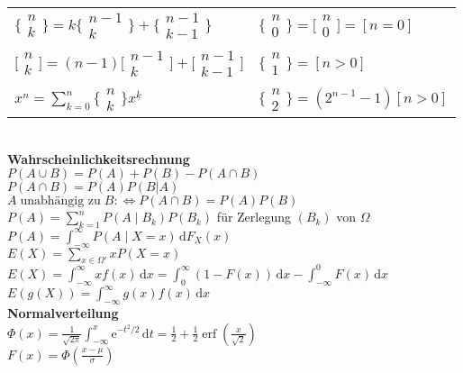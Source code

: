 \documentclass[a4paper,10pt,fleqn,twoside,twocolumn,dvipdfmx]{scrartcl}
\newcommand{\strong}[1]{\textsf{\textbf{#1}}}
\newcommand{\tsbrace}[2]{%
  \big\{\!\begin{smallmatrix}#1\\ #2\end{smallmatrix}\!\big\}}
\newcommand{\tsbracket}[2]{%
  \big[\!\begin{smallmatrix}#1\\ #2\end{smallmatrix}\!\big]}
\begin{document}
\begin{tabular}{@{}l|l}
$\tsbrace{n}{k} = k\tsbrace{n-1}{k}+\tsbrace{n-1}{k-1}$
& $\tsbrace{n}{0} = \tsbracket{n}{0} = [n{=}0]$\\[3pt]
$\tsbracket{n}{k} = (n-1)\tsbracket{n-1}{k}+\tsbracket{n-1}{k-1}$
& $\tsbrace{n}{1}=[n{>}0]$\\[3pt]
$x^n = \sum_{k=0}^n \tsbrace{n}{k} x^{\underline k}$
& $\tsbrace{n}{2} = (2^{n-1}-1)[n{>}0]$
\end{tabular}\\[4pt]
\strong{Wahrscheinlichkeitsrechnung}\\
$P(A\cup B) = P(A)+P(B)-P(A\cap B)$\\
$P(A\cap B) = P(A)P(B|A)$\\
$A\;\text{unabhängig zu}\;B :\Leftrightarrow P(A\cap B) = P(A)P(B)$\\
$P(A) = \sum_{k=1}^n P(A\mid B_k)P(B_k)$ für Zerlegung $(B_k)$ von $\Omega$\\
$P(A) = \int_{-\infty}^\infty P(A\mid X=x)\,\mathrm dF_X(x)$\\
$E(X) = \sum_{x\in\Omega'} xP(X=x)$\\
$E(X) = \int_{-\infty}^\infty xf(x)\,\mathrm dx
= \int_0^\infty (1-F(x))\,\mathrm dx - \int_{-\infty}^0 F(x)\,\mathrm dx$\\
$E(g(X)) = \int_{-\infty}^\infty g(x)f(x)\,\mathrm dx$\\[4pt]
\strong{Normalverteilung}\\
$\Phi(x) = \tfrac{1}{\sqrt{2\pi}}\int_{-\infty}^x \mathrm e^{-t^2/2}\,\mathrm dt
= \tfrac{1}{2}+\tfrac{1}{2}\operatorname{erf}(\tfrac{x}{\sqrt{2}})$\\
$F(x) = \Phi(\tfrac{x-\mu}{\sigma})$


\clearpage
\end{document}
